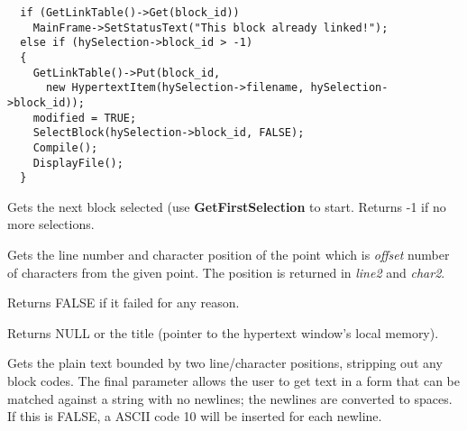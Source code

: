 \begin{verbatim}
  if (GetLinkTable()->Get(block_id))
    MainFrame->SetStatusText("This block already linked!");
  else if (hySelection->block_id > -1)
  {
    GetLinkTable()->Put(block_id,
      new HypertextItem(hySelection->filename, hySelection->block_id));
    modified = TRUE;
    SelectBlock(hySelection->block_id, FALSE);
    Compile();
    DisplayFile();
  }
\end{verbatim}



Gets the next  block selected (use {\bf GetFirstSelection} to start.
Returns -1 if no more selections.



Gets the line number and character position of the point which is {\it offset}
number of characters from the given point. The position is returned in {\it line2}
and {\it char2}.

Returns FALSE if it failed for any reason.



Returns NULL or the title (pointer to the hypertext window's local memory).



Gets the plain text bounded by two line/character positions, stripping out any
block codes. The final parameter allows the user to get text in a form
that can be matched against a string with no newlines; the newlines are converted
to spaces. If this is FALSE, a ASCII code 10 will be inserted for
each newline.



